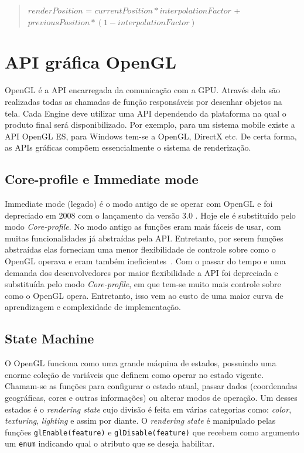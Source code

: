 \documentclass[12pt, 
openright, 
oneside, 
a4paper,    
brazil]{facom-ufu-abntex2}
\begin{document}
\begin{quote}
$renderPosition$ = $currentPosition * interpolationFactor$ + $previousPosition * (1 - interpolationFactor)$
\end{quote}

\section{API gráfica OpenGL}
OpenGL é a API encarregada da comunicação com a GPU. Através dela são realizadas todas as chamadas de função responsáveis por desenhar objetos na tela. Cada Engine deve utilizar uma API dependendo da plataforma na qual o produto final será disponibilizado. Por exemplo, para um sistema mobile existe a API OpenGL ES, para Windows tem-se a OpenGL, DirectX etc. De certa forma, as APIs gráficas compõem essencialmente o sistema de renderização.  

\subsection{Core-profile e Immediate mode}
Immediate mode (legado) é o modo antigo de se operar com OpenGL e foi depreciado em 2008 com o lançamento da versão 3.0 \cite{OpenGLHistory}. Hoje ele é substituído pelo modo \textit{Core-profile}. No modo antigo as funções eram mais fáceis de usar, com muitas funcionalidades já abstraídas pela API. Entretanto, por serem funções abstraídas elas forneciam uma menor flexibilidade de controle sobre como o OpenGL  operava e eram também ineficientes~\cite{LearnOpenGL}. Com o passar do tempo e uma demanda dos desenvolvedores por maior flexibilidade a API foi depreciada e substituída pelo modo \textit{Core-profile}, em que tem-se muito mais controle sobre como o OpenGL opera. Entretanto, isso vem ao custo de uma maior curva de aprendizagem e complexidade de implementação.

\subsection{State Machine}
O OpenGL funciona como uma grande máquina de estados, possuindo uma enorme coleção de variáveis que definem como  operar no estado vigente. Chamam-se as funções para configurar o estado atual, passar dados (coordenadas geográficas, cores e outras informações) ou alterar modos de operação. Um desses estados é o \textit{rendering state} cujo divisão é feita em várias categorias como: \textit{color}, \textit{texturing}, \textit{lighting} e assim por diante. O \textit{rendering state} é manipulado pelas funções \texttt{glEnable(feature)} e \texttt{glDisable(feature)} que recebem como argumento um \texttt{enum} indicando qual o atributo que se deseja habilitar.
\end{document}
